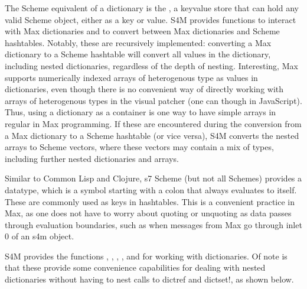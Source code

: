 \documentclass[letterpaper,10pt,english]{sphinxmanual}
\begin{document}
\sphinxAtStartPar
The Scheme equivalent of a dictionary is the , a key\sphinxhyphen{}value
store that can hold any valid Scheme object, either as a key or value.
S4M provides functions to interact with Max dictionaries and to
convert between Max dictionaries and Scheme hash\sphinxhyphen{}tables.
Notably, these are recursively implemented: converting a Max
dictionary to a Scheme hash\sphinxhyphen{}table will convert all values in the
dictionary, including nested dictionaries, regardless of the depth of nesting.
Interesting, Max supports numerically indexed arrays of heterogenous type as values in dictionaries,
even though there is no convenient way of directly working with arrays of heterogenous types
in the visual patcher (one can though in JavaScript).
Thus, using a dictionary as a container is one way to have simple arrays in regular
in Max programming. If these are encountered during the conversion from
a Max dictionary to a Scheme hash\sphinxhyphen{}table (or vice versa), S4M converts the nested arrays
to Scheme vectors, where these vectors may contain a mix of types,
including further nested dictionaries and arrays.

\sphinxAtStartPar
Similar to Common Lisp and Clojure, s7 Scheme (but not all Schemes) provides
a  data\sphinxhyphen{}type, which is a symbol starting with a colon that
always evaluates to itself. These are commonly used as keys in
hash\sphinxhyphen{}tables. This is a convenient practice in Max, as one does not have to worry about
quoting or unquoting as data passes through evaluation boundaries, such
as when messages from Max go through inlet 0 of an s4m object.

\sphinxAtStartPar
S4M provides the functions , ,
, , and 
for working with dictionaries.
Of note is that these provide some convenience capabilities
for dealing with nested dictionaries without having to nest
calls to dict\sphinxhyphen{}ref and dict\sphinxhyphen{}set!, as shown below.
\end{document}
